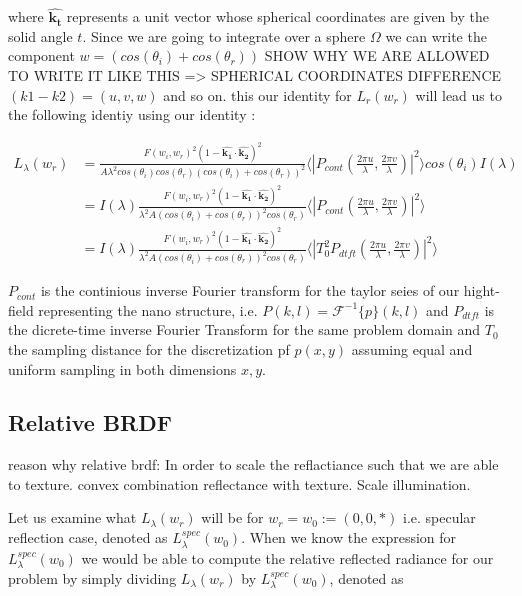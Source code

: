 where $\hat{\mathbf{k_t}}$ represents a unit vector whose spherical coordinates are given by the solid angle $t$.
Since we are going to integrate over a sphere $\Omega$ we can write the component $w=(cos(\theta_i)+cos(\theta_r))$
SHOW WHY WE ARE ALLOWED TO WRITE IT LIKE THIS => SPHERICAL COORDINATES DIFFERENCE $(k1 - k2) = (u,v,w)$ and so on.
this our identity for $L_{r}(w_r)$ will lead us to the following identiy using our identity :

\begin{align*}
L_{\lambda}(w_r) 
& = \frac{F(w_i, w_r)^2 (1-\hat{\mathbf{k_1}}\cdot\hat{ \mathbf{k_2}})^2}{A \lambda^2 cos(\theta_i)cos(\theta_r)  (cos(\theta_i)+cos(\theta_r))^2} \langle \left|P_{cont}(\frac{2\pi u}{\lambda}, \frac{2\pi v}{\lambda})  \right|^2\rangle cos(\theta_i) I(\lambda) \\
& = I(\lambda) \frac{F(w_i, w_r)^2 (1-\hat{\mathbf{k_1}}\cdot\hat{\mathbf{k_2}})^2}{\lambda^2 A (cos(\theta_i)+cos(\theta_r))^2 cos(\theta_r)} \langle \left|P_{cont}(\frac{2\pi u}{\lambda}, \frac{2\pi v}{\lambda})  \right|^2\rangle \\
& = I(\lambda) \frac{F(w_i, w_r)^2 (1-\hat{\mathbf{k_1}}\cdot\hat{\mathbf{k_2}})^2}{\lambda^2 A (cos(\theta_i)+cos(\theta_r))^2 cos(\theta_r)} \langle \left|T_0^2 P_{dtft}(\frac{2\pi u}{\lambda}, \frac{2\pi v}{\lambda})  \right|^2\rangle
\end{align*}

$P_{cont}$ is the continious inverse Fourier transform for the taylor seies of our hight-field representing the nano structure, i.e. $P(k,l) = \mathcal{F}^{-1}\{p\}(k,l)$ and $P_{dtft}$ is the dicrete-time inverse Fourier Transform for the same problem domain and $T_0$ the sampling distance for the discretization pf $p(x,y)$ assuming equal and uniform sampling in both dimensions $x,y$.

\subsection{Relative BRDF}
reason why relative brdf: In order to scale the reflactiance such that we are able to texture. 
convex combination reflectance with texture. Scale illumination.

Let us examine what $L_\lambda(w_r)$ will be for $w_r = w_0 := (0,0,*)$ i.e. specular reflection case, denoted as $L_\lambda^{spec}(w_0)$. 
When we know the expression for $L_\lambda^{spec}(w_0)$ we would be able to compute the relative reflected radiance for our problem by simply dividing $L_\lambda(w_r)$ by $L_\lambda^{spec}(w_0)$, denoted as 

